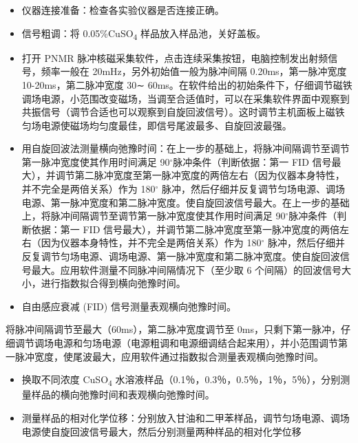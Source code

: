 \begin{itemize}
\item
  仪器连接准备：检查各实验仪器是否连接正确。
\item
  信号粗调：将 0.05\%CuSO\textsubscript{4} 样品放入样品池，关好盖板。
\item
  打开 PNMR 脉冲核磁采集软件，点击连续采集按钮，电脑控制发出射频信号，频率一般在
  20mHz，另外初始值一般为脉冲间隔 0.20ms，第一脉冲宽度
  10-20ms，第二脉冲宽度 30∼
  60ms。在软件给出的初始条件下，仔细调节磁铁调场电源，小范围改变磁场，当调至合适值时，可以在采集软件界面中观察到共振信号（调节合适也可以观察到自旋回波信号）。这时调节主机面板上磁铁匀场电源使磁场均匀度最佳，即信号尾波最多、自旋回波最强。
\item
  用自旋回波法测量横向弛豫时间：在上一步的基础上，将脉冲间隔调节至调节第一脉冲宽度使其作用时间满足
  90$^{\circ}$脉冲条件（判断依据：第一 FID
  信号最大），并调节第二脉冲宽度至第一脉冲宽度的两倍左右（因为仪器本身特性，并不完全是两倍关系）作为
  180$^{\circ}$
  脉冲，然后仔细并反复调节匀场电源、调场电源、第一脉冲宽度和第二脉冲宽度。使自旋回波信号最大。在上一步的基础上，将脉冲间隔调节至调节第一脉冲宽度使其作用时间满足
  90$^{\circ}$脉冲条件（判断依据：第一 FID
  信号最大），并调节第二脉冲宽度至第一脉冲宽度的两倍左右（因为仪器本身特性，并不完全是两倍关系）作为
  180$^{\circ}$
  脉冲，然后仔细并反复调节匀场电源、调场电源、第一脉冲宽度和第二脉冲宽度。使自旋回波信号最大。应用软件测量不同脉冲间隔情况下（至少取
  6 个间隔）的回波信号大小，进行指数拟合得到横向弛豫时间。
\item
  自由感应衰减 (FID) 信号测量表观横向弛豫时间。
\end{itemize}

将脉冲间隔调节至最大（60ms），第二脉冲宽度调节至
0ms，只剩下第一脉冲，仔细调节调场电源和匀场电源（电源粗调和电源细调结合起来用），并小范围调节第一脉冲宽度，使尾波最大，应用软件通过指数拟合测量表观横向弛豫时间。

\begin{itemize}
\item
  换取不同浓度 CuSO\textsubscript{4}
  水溶液样品（0.1％，0.3％，0.5％，1％，5％），分别测量样品的横向弛豫时间和表观横向弛豫时间。
\item
  测量样品的相对化学位移：分别放入甘油和二甲苯样品，调节匀场电源、调场电源使自旋回波信号最大，然后分别测量两种样品的相对化学位移
\end{itemize}
